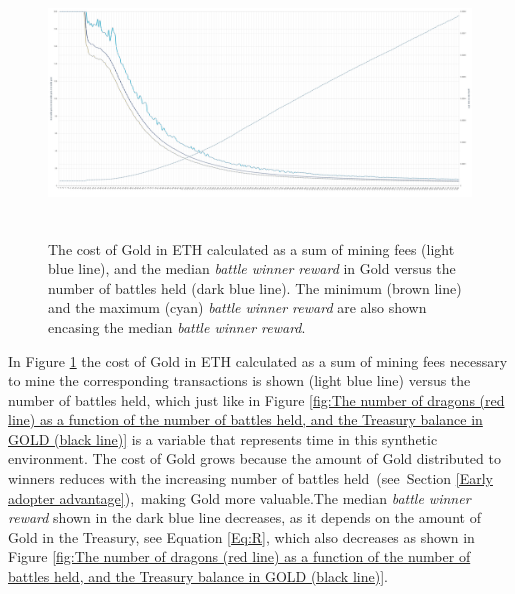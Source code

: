 \documentclass[12pt]{article}
\begin{document}
{\begin{figure}[H]
	\begin{Center}
		\includegraphics[width=6.27in,height=2.76in]{./media/CS1image2.png}
		\caption{The cost of Gold in ETH calculated as a sum of mining fees (light blue line), and the median {\it battle winner reward} in Gold versus the number of battles held (dark blue line). The minimum (brown line) and the maximum (cyan) {\it battle winner reward} are also shown encasing the median {\it battle winner reward}.}
		\label{fig:The cost of Gold in dollars calculated as a sum of mining fees cost (light blue line), and the median battle reward in Gold versus the number of battles held (dark blue line).}
	\end{Center}
\end{figure}




In Figure \ref{fig:The cost of Gold in dollars calculated as a sum of mining fees cost (light blue line), and the median battle reward in Gold versus the number of battles held (dark blue line).} the cost of Gold in ETH calculated as a sum of mining fees necessary to mine the corresponding transactions is shown (light blue line) versus the number of battles held, which just like in Figure \ref{fig:The number of dragons (red line) as a function of the number of battles held, and the Treasury balance in GOLD (black line)} is a variable that represents time in this synthetic environment. The cost of Gold grows because the amount of Gold distributed to winners reduces with the increasing number of battles held\ (see\ Section   \ref{Early adopter advantage}),\ making Gold more valuable.The median {\it battle winner reward} shown in the dark blue line decreases, as it depends on the amount of Gold in the Treasury, see Equation  \ref{Eq:R}, which also decreases as shown in Figure \ref{fig:The number of dragons (red line) as a function of the number of battles held, and the Treasury balance in GOLD (black line)}.\par

}
\end{document}
